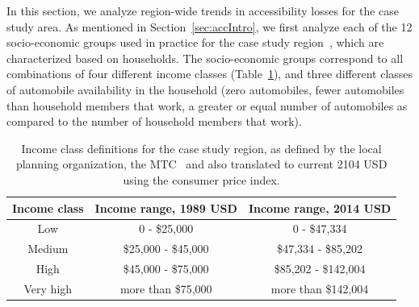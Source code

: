 In this section, we analyze region-wide trends in accessibility losses for the case study area. As mentioned in Section~\ref{sec:accIntro}, we first analyze each of the 12 socio-economic groups used in practice for the case study region~\cite{ory_personal_2013}, which are characterized based on households. The socio-economic groups correspond to all combinations of four different income classes (Table~\ref{tab:incomes}),
and three different classes of automobile availability in the household (zero automobiles, fewer automobiles than household members that work, a greater or equal number of automobiles as compared to the number of household members that work).


\begin{table}
\centering
\begin{tabular}{c|c|c}
\textbf{Income class}           & \textbf{Income range, 1989 USD} & \textbf{Income range, 2014 USD} \\
\hline
Low & 0 - \$25,000 & 0 - \$47,334\\
Medium &  \$25,000 - \$45,000 & \$47,334 - \$85,202\\
High & \$45,000 - \$75,000 & \$85,202 - \$142,004 \\
Very high & more than \$75,000 & more than \$142,004
\end{tabular}
\caption{Income class definitions for the case study region, as defined by the local planning organization, the MTC~\cite{ory_personal_2013} and also translated to current 2104 USD using the consumer price index.}
\label{tab:incomes}
\end{table}



